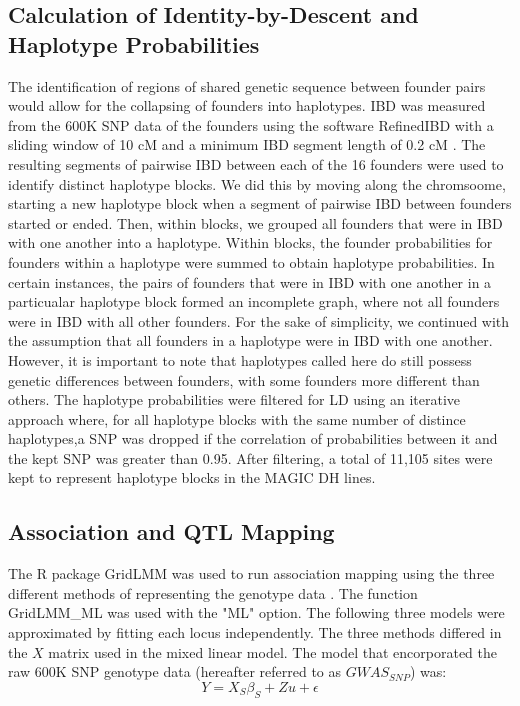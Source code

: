 \documentclass[article,9pt,twocolumn,twoside]{rilabRxiv}
\begin{document}
\subsection{Calculation of Identity-by-Descent and Haplotype Probabilities}
The identification of regions of shared genetic sequence between founder pairs would allow for the collapsing of founders into haplotypes.
IBD was measured from the 600K SNP data of the founders using the software RefinedIBD with a sliding window of 10 cM and a minimum IBD segment length of 0.2 cM \citep{Browning}.
The resulting segments of pairwise IBD between each of the 16 founders were used to identify distinct haplotype blocks.
We did this by moving along the chromsoome, starting a new haplotype block when a segment of pairwise IBD between founders started or ended.
Then, within blocks, we grouped all founders that were in IBD with one another into a haplotype.
Within blocks, the founder probabilities for founders within a haplotype were summed to obtain haplotype probabilities.
In certain instances, the pairs of founders that were in IBD with one another in a particualar haplotype block formed an incomplete graph, where  not all founders were in IBD with all other founders.
For the sake of simplicity, we continued with the assumption that all founders in a haplotype were in IBD with one another.
However, it is important to note that haplotypes called here do still possess genetic differences between founders, with some founders more different than others.
The haplotype probabilities were filtered for LD using an iterative approach where, for all haplotype blocks with the same number of distince haplotypes,a SNP was dropped if the correlation of probabilities between it and the kept SNP was greater than 0.95.
After filtering, a total of 11,105 sites were kept to represent haplotype blocks in the MAGIC DH lines.

\subsection{Association and QTL Mapping}
The R package GridLMM was used to run association mapping using the three different methods of representing the genotype data \citep{Runcie}.
The function GridLMM\_ML was used with the "ML" option.
The following three models were approximated by fitting each locus independently.
The three methods differed in the $X$ matrix used in the mixed linear model.
The model that encorporated the raw 600K SNP genotype data (hereafter referred to as $GWAS_{SNP}$) was:
\begin{equation}
\label{eqn:gridlmm1}
 Y = X_S{\beta_S} + Zu + \epsilon
\end{equation}
\end{document}
